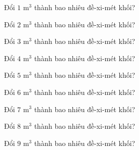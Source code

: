 
\begin{ex}
  Đổi $1\text{ m}^3$ thành bao nhiêu đề-xi-mét khối?
\end{ex}

\begin{ex}
  Đổi $2\text{ m}^3$ thành bao nhiêu đề-xi-mét khối?
\end{ex}

\begin{ex}
  Đổi $3\text{ m}^3$ thành bao nhiêu đề-xi-mét khối?
\end{ex}

\begin{ex}
  Đổi $4\text{ m}^3$ thành bao nhiêu đề-xi-mét khối?
\end{ex}

\begin{ex}
  Đổi $5\text{ m}^3$ thành bao nhiêu đề-xi-mét khối?
\end{ex}

\begin{ex}
  Đổi $6\text{ m}^3$ thành bao nhiêu đề-xi-mét khối?
\end{ex}

\begin{ex}
  Đổi $7\text{ m}^3$ thành bao nhiêu đề-xi-mét khối?
\end{ex}

\begin{ex}
  Đổi $8\text{ m}^3$ thành bao nhiêu đề-xi-mét khối?
\end{ex}

\begin{ex}
  Đổi $9\text{ m}^3$ thành bao nhiêu đề-xi-mét khối?
\end{ex}

